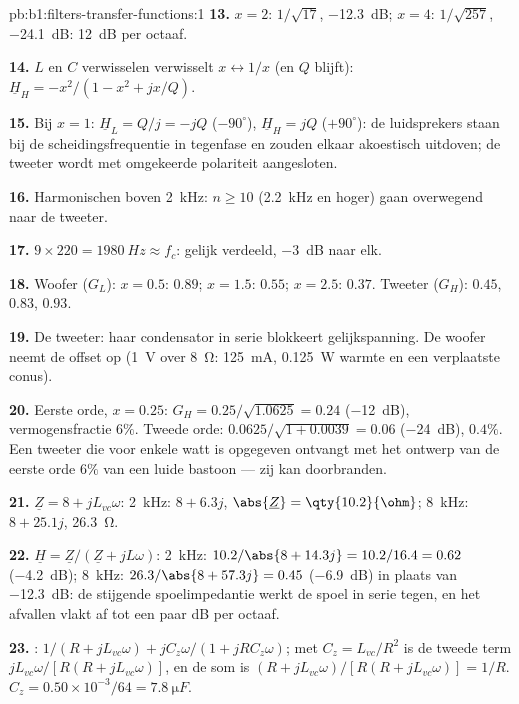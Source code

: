 \begin{solution}{pb:b1:filters-transfer-functions:1}
\textbf{13.} $x = 2$: $1/\sqrt{17}$, \qty{-12.3}{dB}; $x = 4$: $1/\sqrt{257}$,
\qty{-24.1}{dB}: \qty{12}{dB} per octaaf.

\textbf{14.} $L$ en $C$ verwisselen verwisselt $x \leftrightarrow 1/x$ (en
$Q$ blijft): $\underline H_H = -x^2/(1 - x^2 + jx/Q)$.

\textbf{15.} Bij $x = 1$: $\underline H_L = Q/j = -jQ$ ($-90^\circ$),
$\underline H_H = jQ$ ($+90^\circ$): de luidsprekers staan bij de
scheidingsfrequentie in tegenfase en zouden elkaar akoestisch uitdoven; de tweeter
wordt met omgekeerde polariteit aangesloten.

\textbf{16.} Harmonischen boven \qty{2}{kHz}: $n \geq 10$ (\qty{2.2}{kHz}
en hoger) gaan overwegend naar de tweeter.

\textbf{17.} $9 \times 220 = \qty{1980}{Hz} \approx f_c$: gelijk verdeeld,
\qty{-3}{dB} naar elk.

\textbf{18.} Woofer ($G_L$): $x = 0.5$: $0.89$; $x = 1.5$: $0.55$; $x = 2.5$:
$0.37$. Tweeter ($G_H$): $0.45$, $0.83$, $0.93$.

\textbf{19.} De tweeter: haar condensator in serie blokkeert gelijkspanning. De woofer
neemt de offset op (\qty{1}{V} over \qty{8}{\ohm}: \qty{125}{mA},
\qty{0.125}{W} warmte en een verplaatste conus).

\textbf{20.} Eerste orde, $x = 0.25$: $G_H = 0.25/\sqrt{1.0625} = 0.24$
(\qty{-12}{dB}), vermogensfractie $6\%$. Tweede orde: $0.0625/\sqrt{1 +
0.0039} = 0.06$ (\qty{-24}{dB}), $0.4\%$. Een tweeter die voor enkele watt is
opgegeven ontvangt met het ontwerp van de eerste orde $6\%$ van een luide bastoon --- zij kan
doorbranden.

\textbf{21.} $\underline Z = 8 + jL_{vc}\omega$: \qty{2}{kHz}: $8 + 6.3j$,
$\abs{\underline Z} = \qty{10.2}{\ohm}$; \qty{8}{kHz}: $8 + 25.1j$,
\qty{26.3}{\ohm}.

\textbf{22.} $\underline H = \underline Z/(\underline Z + jL\omega)$:
\qty{2}{kHz}: $10.2/\abs{8 + 14.3j} = 10.2/16.4 = 0.62$ (\qty{-4.2}{dB});
\qty{8}{kHz}: $26.3/\abs{8 + 57.3j} = 0.45$ (\qty{-6.9}{dB}) in plaats van
\qty{-12.3}{dB}: de stijgende spoelimpedantie werkt de spoel in serie tegen, en
het afvallen vlakt af tot een paar dB per octaaf.

\textbf{23.} : $1/(R + jL_{vc}\omega) + jC_z\omega/(1 + jRC_z\omega)$;
met $C_z = L_{vc}/R^2$ is de tweede term $jL_{vc}\omega/[R(R +
jL_{vc}\omega)]$, en de som is $(R + jL_{vc}\omega)/[R(R + jL_{vc}\omega)]
= 1/R$. $C_z = 0.50\times10^{-3}/64 = \qty{7.8}{\micro F}$.


\end{solution}

